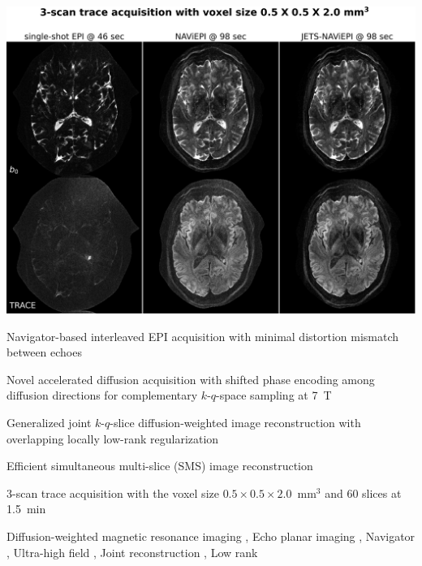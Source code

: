 \documentclass[preprint,12pt,authoryear,review]{elsarticle}
\begin{document}
\begin{frontmatter}
        \begin{graphicalabstract}
            \includegraphics[width=\linewidth]{../figures/graph.png}
        \end{graphicalabstract}

        \begin{highlights}
            \item Navigator-based interleaved EPI acquisition with
            minimal distortion mismatch between echoes

            \item Novel accelerated diffusion acquisition
            with shifted phase encoding among diffusion directions
            for complementary $k$-$q$-space sampling at \SI{7}{\tesla}

            \item Generalized joint $k$-$q$-slice
            diffusion-weighted image reconstruction
            with overlapping locally low-rank regularization

            \item Efficient simultaneous multi-slice (SMS)
            image reconstruction

            \item 3-scan trace acquisition with the voxel size
            $0.5\times0.5\times2.0$~mm$^3$ and 60 slices
            at \SI{1.5}{\minute}
        \end{highlights}

        \begin{keyword}
            Diffusion-weighted magnetic resonance imaging \sep
            Echo planar imaging \sep
            Navigator \sep
            Ultra-high field \sep
            Joint reconstruction \sep
            Low rank
        \end{keyword}

    \end{frontmatter}
\end{document}
